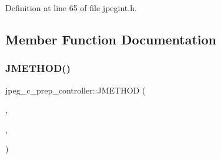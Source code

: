 Definition at line 65 of file jpegint.\+h.



\subsection{Member Function Documentation}
\mbox{\label{structjpeg__c__prep__controller_af2fb43bbf035ffe6b1a28fb2382db63d}} 
\subsubsection{\texorpdfstring{JMETHOD()}{JMETHOD()}\hspace{0.1cm}{\footnotesize\ttfamily [1/2]}}
{\footnotesize\ttfamily jpeg\+\_\+c\+\_\+prep\+\_\+controller\+::\+J\+M\+E\+T\+H\+OD (\begin{DoxyParamCaption}\item[{void}]{,  }\item[{\mbox{\hyperlink{jddctmgr_8c_a1964f006adb8fb80f57e455f6452aec1}{start\+\_\+pass}}}]{,  }\item[{(\mbox{\hyperlink{jpeglib_8h_add2a072c54e3a51550f4975f7ddb91e7}{j\+\_\+compress\+\_\+ptr}} cinfo, \mbox{\hyperlink{jpegint_8h_a1f0803342372ac62b6903c399399c874}{J\+\_\+\+B\+U\+F\+\_\+\+M\+O\+DE}} pass\+\_\+mode)}]{ }\end{DoxyParamCaption})}

\mbox{\label{structjpeg__c__prep__controller_a84100e06666ea90e6734dce2a10af554}} 
